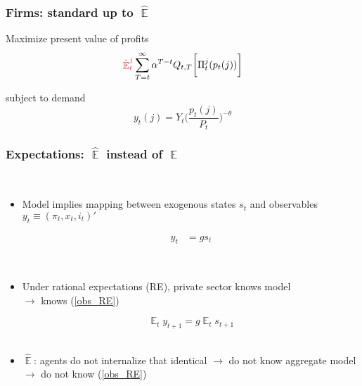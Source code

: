 \documentclass[10pt]{beamer}
\DeclareMathOperator{\E}{\mathbb{E}}
\begin{document}
\begin{frame}
	\frametitle{Firms: standard up to $\hat{\E}$}

Maximize present value of profits
\begin{equation}
\textcolor{brownreddark}{\hat{\E}^j_t}\sum^{\infty}_{T=t}\alpha^{T-t} Q_{t,T} \bigg[ \Pi^j_t(p_t(j))\bigg]
\label{lifetime_profits}
\end{equation}

subject to demand
\begin{equation}
y_t(j) = Y_t \bigg(\frac{p_t(j)}{P_t}\bigg)^{-\theta}
\end{equation}


\vfill

\hfill \hyperlink{details_HHs_firms}{}

\end{frame}

\begin{frame}
	\frametitle{Expectations: $\hat{\E}$ instead of $\E$}

\

\begin{itemize}
\item Model implies mapping between exogenous states $s_t$ and observables $y_t \equiv (\pi_t, x_t, i_t)'$

 \begin{align}
 y_t & = g s_t \label{obs_RE}
 \end{align}
 
\
\pause
\item Under rational expectations (RE), private sector knows model \\
$\rightarrow$ knows (\ref{obs_RE}) 

\begin{equation}
\E_t y_{t+1} = g \E_t s_{t+1}
\end{equation}
\
\pause
\item $\hat{\E}$: agents do not internalize that identical $\rightarrow$ do not know aggregate model $\rightarrow$ do not know (\ref{obs_RE}) \\



\end{itemize}



\end{frame}
\end{document}
